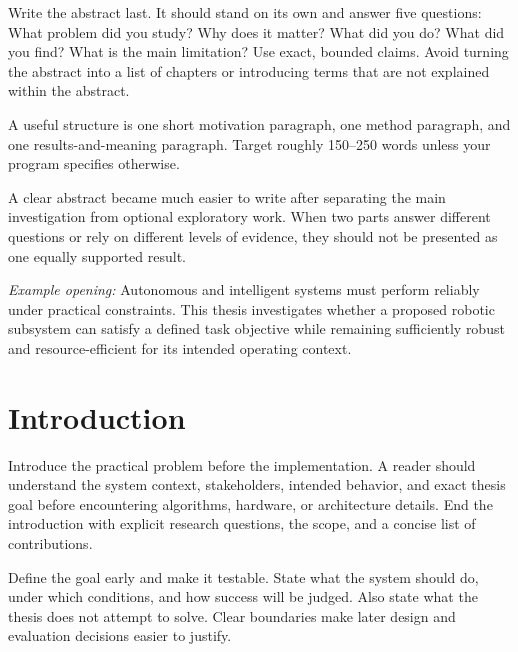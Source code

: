 \documentclass[a4paper,11pt,oneside]{article}
\begin{document}
  \begin{guidance}
  Write the abstract last. It should stand on its own and answer five questions:
  What problem did you study? Why does it matter? What did you do? What did you
  find? What is the main limitation? Use exact, bounded claims. Avoid turning
  the abstract into a list of chapters or introducing terms that are not
  explained within the abstract.

  A useful structure is one short motivation paragraph, one method paragraph,
  and one results-and-meaning paragraph. Target roughly 150--250 words unless
  your program specifies otherwise.
  \end{guidance}

  \begin{experiencenote}
  A clear abstract became much easier to write after separating the main
  investigation from optional exploratory work. When two parts answer different
  questions or rely on different levels of evidence, they should not be
  presented as one equally supported result.
  \end{experiencenote}

  \textit{Example opening:}
  Autonomous and intelligent systems must perform reliably under practical
  constraints. This thesis investigates whether a proposed robotic subsystem
  can satisfy a defined task objective while remaining sufficiently robust and
  resource-efficient for its intended operating context.

  \newpage
  \tableofcontents

  \clearpage

  \section{Introduction}

  \begin{guidance}
  Introduce the practical problem before the implementation. A reader should
  understand the system context, stakeholders, intended behavior, and exact
  thesis goal before encountering algorithms, hardware, or architecture
  details. End the introduction with explicit research questions, the scope,
  and a concise list of contributions.

  Define the goal early and make it testable. State what the system should do,
  under which conditions, and how success will be judged. Also state what the
  thesis does not attempt to solve. Clear boundaries make later design and
  evaluation decisions easier to justify.
  \end{guidance}
\end{document}
